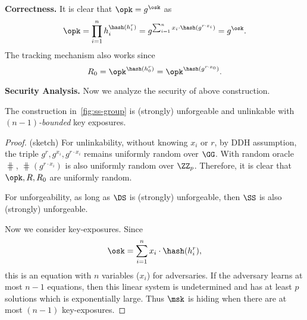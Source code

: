 \smallskip\noindent\textbf{Correctness.}
It is clear that $\opk=g^\osk$ as
$$\opk=\prod_{i=1}^n h_i^{\hash(h_i^r)}=g^{\sum_{i=1}^n x_i\cdot\hash(g^{r\cdot x_i})}=g^\osk.
$$
The tracking mechanism also works since
$$R_0=\opk^{\hash(h_0^r)}=\opk^{\hash(g^{r\cdot x_0})}.
$$

\smallskip\noindent\textbf{Security Analysis.} Now we analyze the security of above construction.
\begin{theorem}
The construction in~\cref{fig:ss-group} is (strongly) unforgeable and unlinkable with \emph{$(n-1)$-bounded} key exposures.
\end{theorem}
\begin{proof}(sketch)
For unlinkability, without knowing $x_i$ or $r$, by DDH assumption, the triple $g^r,g^{x_i},g^{r\cdot x_i}$ remains uniformly random over $\GG$. With random oracle $\hash$, $\hash(g^{r\cdot x_i})$ is also uniformly random over $\ZZ_p$. Therefore, it is clear that $\opk,R,R_0$ are uniformly random.

For unforgeability, as long as $\DS$ is (strongly) unforgeable, then $\SS$ is also (strongly) unforgeable.

Now we consider key-exposures. Since
$$\osk=\sum_{i=1}^n x_i\cdot \hash(h_i^r),
$$
this is an equation with $n$ variables ($x_i$) for adversaries. If the adversary learns at most $n-1$ equations, then this linear system is undetermined and has at least $p$ solutions which is exponentially large. Thus $\msk$ is hiding when there are at most $(n-1)$ key-exposures.
\end{proof}
  